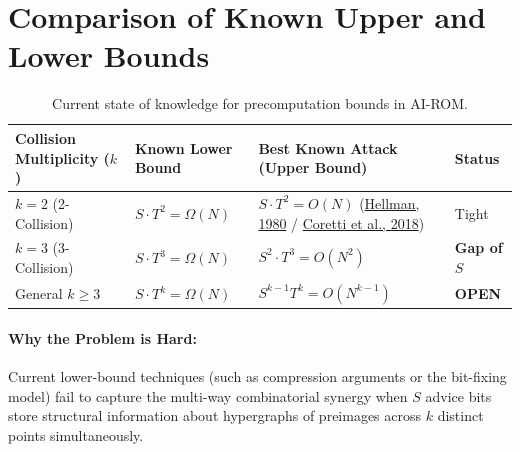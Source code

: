 \documentclass{aicr-conjecture}
\begin{document}
\section{Comparison of Known Upper and Lower Bounds}

\begin{table}[h!]
\centering
\small
\begin{tabularx}{\textwidth}{@{}XXXl@{}}
\toprule
\textbf{Collision Multiplicity ($k$)} & \textbf{Known Lower Bound} & \textbf{Best Known Attack (Upper Bound)} & \textbf{Status} \\ \midrule
$k = 2$ (2-Collision) & $S \cdot T^2 = \Omega(N)$ & $S \cdot T^2 = O(N)$ (\href{https://www-ee.stanford.edu/~hellman/publications/36.pdf}{Hellman, 1980} / \href{https://eprint.iacr.org/2017/937.pdf}{Coretti et al., 2018}) & Tight \\
$k = 3$ (3-Collision) & $S \cdot T^3 = \Omega(N)$ & $S^2 \cdot T^3 = O(N^2)$ & \textbf{Gap of $S$} \\
General $k \ge 3$ & $S \cdot T^k = \Omega(N)$ & $S^{k-1} T^k = O(N^{k-1})$ & \textbf{OPEN} \\ \bottomrule
\end{tabularx}
\caption{Current state of knowledge for precomputation bounds in AI-ROM.}
\end{table}

\paragraph{Why the Problem is Hard:}
Current lower-bound techniques (such as compression arguments or the bit-fixing model) fail to capture the multi-way combinatorial synergy when $S$ advice bits store structural information about hypergraphs of preimages across $k$ distinct points simultaneously.
\end{document}
